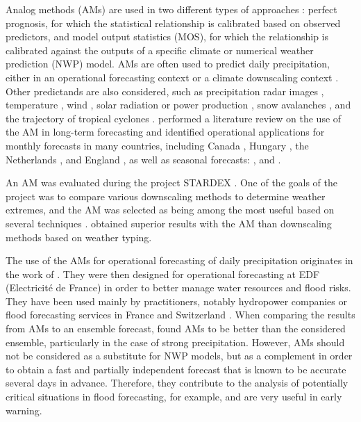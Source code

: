 \documentclass[gmd]{copernicus}
\begin{document}
Analog methods (AMs) are used in two different types of approaches \citep{Rummukainen1997}: perfect prognosis, for which the statistical relationship is calibrated based on observed predictors, and model output statistics (MOS), for which the relationship is calibrated against the outputs of a specific climate or numerical weather prediction (NWP) model. AMs are often used to predict daily precipitation, either in an operational forecasting context \citep[e.g.][]{Guilbaud1997, Bontron2005, Hamill2006, Bliefernicht2010, Marty2012, Horton2012, Hamill2015, BenDaoud2016} or a climate downscaling context \citep[e.g.][]{Zorita1999, Wetterhall2005, Wetterhall2007, Matulla2007, Radanovics2013, Chardon2014, Dayon2015, Raynaud2016b}. Other predictands are also considered, such as precipitation radar images \citep{Panziera2011,Foresti2015a}, temperature \citep{Radinovic1975, Woodcock1980, Kruizinga1983, DelleMonache2013, Caillouet2016, Raynaud2016b}, wind \citep{Gordon1987, DelleMonache2013, DelleMonache2011, Vanvyve2015, Alessandrini2015, Junk2015, Junk2015c}, solar radiation or power production \citep{Alessandrini2015a, Bessa2015, Raynaud2016b}, snow avalanches \citep{Obled1980, Bolognesi1993}, and the trajectory of tropical cyclones \citep{Keenan1981, Sievers2000, Fraedrich2003}. \citet{Guilbaud1997} performed a literature review on the use of the AM in long-term forecasting and identified operational applications for monthly forecasts in many countries, including Canada \citep{Shabbar1986},  Hungary \citep{Toth1989}, the Netherlands \citep{Nap1981}, and England \citep{Murray1974}, as well as seasonal forecasts: \citet{Barnett1978}, \citet{Bergen1982} and \citet{Livezey1988}.

An AM was evaluated during the project STARDEX \citep[\textit{STAtistical and Regional dynamical Downscaling of EXtremes for European regions}, see][]{Goodess2003, Stardex2005}. One of the goals of the project was to compare various downscaling methods to determine weather extremes, and the AM was selected as being among the most useful based on several techniques \citep{Maheras2005, Schmidli2007}. \citet{Bliefernicht2010} obtained superior results with the AM than downscaling methods based on weather typing.

The use of the AMs for operational forecasting of daily precipitation originates in the work of \citet{Duband1970, Duband1974, Duband1981}. They were then designed for operational forecasting at EDF (Electricit\'{e} de France) in order to better manage water resources and flood risks. They have been used mainly by practitioners, notably hydropower companies \citep{Desaint2008a, BenDaoud2009, Obled2014} or flood forecasting services in France and Switzerland \citep{Marty2010, GarciaHernandez2009b, Horton2012}. When comparing the results from AMs to an ensemble forecast, \citet{Marty2010} found AMs to be better than the considered ensemble, particularly in the case of strong precipitation. However, AMs should not be considered as a substitute for NWP models, but as a complement in order to obtain a fast and partially independent forecast that is known to be accurate several days in advance. Therefore, they contribute to the analysis of potentially critical situations in flood forecasting, for example, and are very useful in early warning.
\end{document}
